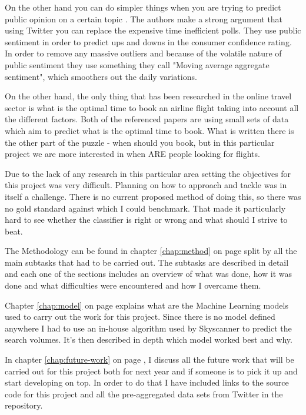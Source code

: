 \documentclass[minf,frontabs,twoside,singlespacing,parskip]{infthesis}
\begin{document}
On the other hand you can do simpler things when you are trying to predict public opinion on a certain topic \cite{twitpoll}. The authors make a strong argument that using Twitter you can replace the expensive time inefficient polls. They use public sentiment in order to predict ups and downs in the consumer confidence rating. In order to remove any massive outliers and because of the volatile nature of public sentiment they use something they call "Moving average aggregate sentiment", which smoothers out the daily variations. 



On the other hand, the only thing that has been researched in the online travel sector is what is the optimal time to book an airline flight taking into account all the different factors. \cite{Hamletkdd03} \cite{ijcai} 
Both of the referenced papers are using small sets of data which aim to predict what is the optimal time to book. What is written there is the other part of the puzzle - when should you book, but in this particular project we are more interested in when ARE people looking for flights.


Due to the lack of any research in this particular area setting the objectives for this project was very difficult. Planning on how to approach and tackle was in itself a challenge. There is no current proposed method of doing this, so there was no gold standard against which I could benchmark. That made it particularly hard to see whether the classifier is right or wrong and what should I strive to beat.


The Methodology can be found in chapter \ref{chap:method} on page \pageref{chap:method} split by all the main subtasks that had to be carried out. The subtasks are described in detail and each one of the sections includes an overview of what was done, how it was done and what difficulties were encountered and how I overcame them. 


Chapter \ref{chap:model} on page \pageref{chap:model} explains what are the Machine Learning models used to carry out the work for this project. Since there is no model defined anywhere I had to use an in-house algorithm used by Skyscanner to predict the search volumes. It's then described in depth which model worked best and why. 


In chapter \ref{chap:future-work} on page \pageref{chap:future-work}, I discuss all the future work that will be carried out for this project both for next year and if someone is to pick it up and start developing on top. In order to do that I have included links to the source code for this project and all the pre-aggregated data sets from Twitter in the repository.
\end{document}
